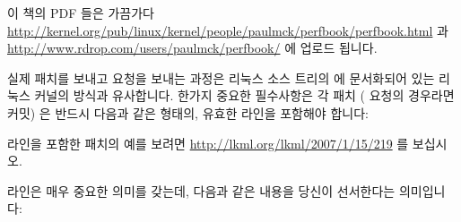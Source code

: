 이 책의 PDF 들은 가끔가다
\url{http://kernel.org/pub/linux/kernel/people/paulmck/perfbook/perfbook.html}
과 \url{http://www.rdrop.com/users/paulmck/perfbook/} 에 업로드 됩니다.

\iffalse
PDFs of this book are sporadically posted at
\url{http://kernel.org/pub/linux/kernel/people/paulmck/perfbook/perfbook.html}
and at
\url{http://www.rdrop.com/users/paulmck/perfbook/}.
\fi

실제 패치를 보내고  요청을 보내는 과정은 리눅스 소스 트리의
 에 문서화되어 있는 리눅스 커널의 방식과
유사합니다.
한가지 중요한 필수사항은 각 패치 ( 요청의 경우라면 커밋) 은 반드시
다음과 같은 형태의, 유효한  라인을 포함해야 합니다:

\iffalse
The actual process of contributing patches and sending \co{git pull}
requests is similar to that of the Linux kernel, which is documented
in the \co{Documentation/SubmittingPatches} file in the Linux source tree.
One important requirement is that each patch (or commit, in the case
of a \co{git pull} request) must contain a valid \co{Signed-off-by:} line,
which has the following format:
\fi

\begin{quote}
	{ \scriptsize
	}
\end{quote}

 라인을 포함한 패치의 예를 보려면
\url{http://lkml.org/lkml/2007/1/15/219} 를 보십시오.

\iffalse
Please see \url{http://lkml.org/lkml/2007/1/15/219} for an example
patch containing a \co{Signed-off-by:} line.
\fi

 라인은 매우 중요한 의미를 갖는데, 다음과 같은 내용을 당신이
선서한다는 의미입니다:

\iffalse
It is important to note that the \co{Signed-off-by:} line has
a very specific meaning, namely that you are certifying that:
\fi

